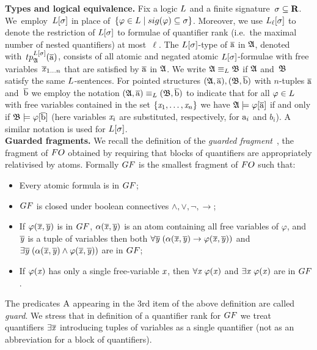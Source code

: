 \noindent \textbf{Types and logical equivalence.}
Fix a logic $\logicL$ and a finite signature~$\sigma \subseteq \mathbf{R}$. 
We~employ~$\logicL[\sigma]$ in place of~$\{ \varphi \in \logicL \mid \sig(\varphi) \subseteq \sigma \}$.
Moreover, we use $\logicL_\ell[\sigma]$ to denote the restriction of $\logicL[\sigma]$ to formulae of quantifier rank (i.e.\ the maximal number of nested quantifiers) at most~$\ell$.  
%
The $\logicL[\sigma]$-type of $\overline{\mathrm{a}}$ in ${\mathfrak{A}}$, denoted with~$\tp{\logicL[\sigma]}{\str{A}}{\elemtuplea}$, consists of all atomic and negated atomic $\logicL[\sigma]$-formulae with free variables~$\overline{\mathit{x}}_{1\ldots n}$ that are satisfied by $\overline{\mathrm{a}}$ in ${\mathfrak{A}}$.
We write $\str{A} \equiv_\logicL \str{B}$ if ${\mathfrak{A}}$ and~${\mathfrak{B}}$ satisfy the same $\logicL$-sentences.
For pointed structures $({\mathfrak{A}}, \overline{\mathrm{a}}), ({\mathfrak{B}}, \overline{\mathrm{b}})$ with $n$-tuples $\overline{\mathrm{a}}$ and~$\overline{\mathrm{b}}$ we employ the notation $(\str{A}, \elemtuplea) \equiv_\logicL (\str{B}, \elemtupleb)$ to indicate that for all $\varphi \in \logicL$ with free variables contained in the set $\{ \mathit{x}_1, \ldots, \mathit{x}_n \}$ we have ${\mathfrak{A}} \models \varphi[\overline{\mathrm{a}}]$ if and only if ${\mathfrak{B}} \models \varphi[\overline{\mathrm{b}}]$ (here variables $\mathit{x}_i$ are substituted, respectively, for $\mathrm{a}_i$ and $b_i$).
A similar notation is used for $\logicL[\sigma]$.\\

\noindent \textbf{Guarded fragments.}
We recall the definition of the \emph{guarded fragment}~\cite[Sec. 4.1]{AndrekaNB98}, \ie the fragment of $\FO$ obtained by requiring that blocks of quantifiers are appropriately relativised by atoms.
Formally $\GF$ is the smallest fragment of $\FO$  such that:
\begin{itemize}\itemsep0em
    \item Every atomic formula is in $\GF$;
    \item $\GF$ is closed under boolean connectives $\land, \lor, \neg, \to$;
    \item If $\varphi(\overline{\mathit{x}}, \overline{\mathit{y}})$ is in $\GF$, $\alpha(\overline{\mathit{x}}, \overline{\mathit{y}})$ is an atom containing all free variables of $\varphi$, and $\overline{\mathit{y}}$ is a tuple of variables then both $\forall{\overline{\mathit{y}}} \; (\alpha(\overline{\mathit{x}}, \overline{\mathit{y}}) \to \varphi(\overline{\mathit{x}}, \overline{\mathit{y}}))$ and $\exists{\overline{\mathit{y}}} \; (\alpha(\overline{\mathit{x}}, \overline{\mathit{y}}) \land \varphi(\overline{\mathit{x}}, \overline{\mathit{y}}))$ are in $\GF$; 
    \item If $\varphi(\mathit{x})$ has only a single free-variable $\mathit{x}$, then $\forall{\mathit{x}}\; \varphi(\mathit{x})$ and $\exists{\mathit{x}}\; \varphi(\mathit{x})$ are in $\GF$.
\end{itemize}
The predicates $\mathrm{A}$ appearing in the 3rd item of the above definition are called \emph{guard}.
We stress that in definition of a quantifier rank for $\GF$ we treat quantifiers $\exists{\overline{\mathit{x}}}$ introducing tuples of variables as a single quantifier (not as an abbreviation for a block of quantifiers).

